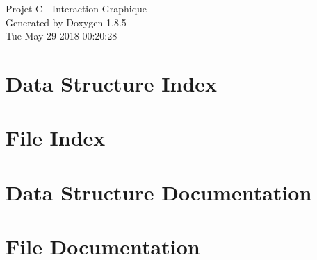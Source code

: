 \documentclass[twoside]{book}
\newcommand{\clearemptydoublepage}{%
  \newpage{\pagestyle{empty}\cleardoublepage}%
}
\begin{document}
\hypersetup{pageanchor=false}
\begin{titlepage}
\vspace*{7cm}
\begin{center}%
{\Large Projet C -\/ Interaction Graphique }\\
\vspace*{1cm}
{\large Generated by Doxygen 1.8.5}\\
\vspace*{0.5cm}
{\small Tue May 29 2018 00:20:28}\\
\end{center}
\end{titlepage}
\clearemptydoublepage
\tableofcontents
\clearemptydoublepage
{}
\hypersetup{pageanchor=true}

\chapter{Data Structure Index}

\chapter{File Index}

\chapter{Data Structure Documentation}


















\chapter{File Documentation}























\newpage
{}
{}
\printindex
\end{document}
